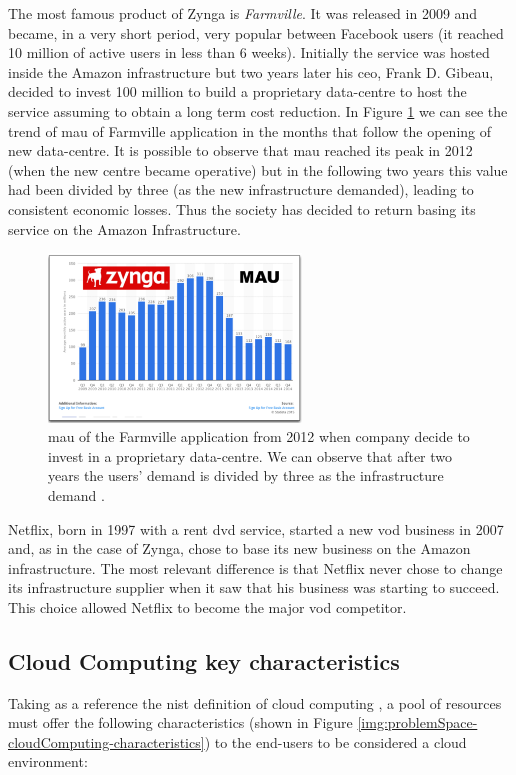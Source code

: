 The most famous product of Zynga is \textit{Farmville}. It was released in 2009 and became, in a very
short period, very popular between Facebook users (it reached 10 million of active users in less than
6 weeks). Initially the service was hosted inside the Amazon infrastructure but two years later his
\acs{ceo}, Frank D. Gibeau, decided to invest \textdollar{}100 million to build a proprietary data-centre
to host the service assuming to obtain a long term cost reduction. In Figure
\ref{img:problemSpace-capexOpex-zyngaCase} we can see the trend of \ac{mau} of Farmville application
in the months that follow the opening of new data-centre. It is possible to observe that \ac{mau} reached
its peak in 2012 (when the new centre became operative) but in the following two years this value had
been divided by three (as the new infrastructure demanded), leading to consistent economic losses.
Thus the society has decided to return basing its service on the Amazon Infrastructure.

\begin{figure}
	\centering{}
	\includegraphics[width=0.6\textwidth]{chapters/problem/images/zynga-case.png}
	\caption[\acs{mau} of Farmville application after 2012]{\acf{mau} of the Farmville application from
		2012 when company decide to invest in a proprietary data-centre. We can observe that after two
		years the users' demand is divided by three as the infrastructure demand \cite{netflixZynga}.}
	\label{img:problemSpace-capexOpex-zyngaCase}
\end{figure}

Netflix, born in 1997 with a rent \acs{dvd} service, started a new \ac{vod} business in 2007 and, as
in the case of Zynga, chose to base its new business on the Amazon infrastructure. The most relevant
difference is that Netflix never chose to change its infrastructure supplier when it saw that his
business was starting to succeed. This choice allowed Netflix to become the major \ac{vod} competitor.

\subsection*{Cloud Computing key characteristics}
\label{sec:problemSpace-cloudComputing-characteristics}
Taking as a reference the \ac{nist} definition of cloud computing \cite{nistCloudComputing}, a pool of resources
must offer the following characteristics (shown in Figure \ref{img:problemSpace-cloudComputing-characteristics})
to the end-users to be considered a cloud environment:

